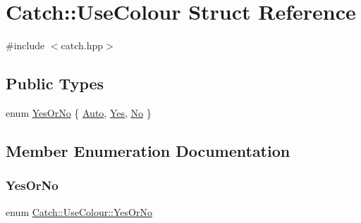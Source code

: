 \hypertarget{struct_catch_1_1_use_colour}{}\section{Catch\+:\+:Use\+Colour Struct Reference}
\label{struct_catch_1_1_use_colour}


{\ttfamily \#include $<$catch.\+hpp$>$}

\subsection*{Public Types}
\begin{DoxyCompactItemize}
\item 
enum \mbox{\hyperlink{struct_catch_1_1_use_colour_a6aa78da0c2de7539bb9e3757e204a3f1}{Yes\+Or\+No}} \{ \mbox{\hyperlink{struct_catch_1_1_use_colour_a6aa78da0c2de7539bb9e3757e204a3f1a5c7fa9f5f5536187e8f47df35b892bb7}{Auto}}, 
\mbox{\hyperlink{struct_catch_1_1_use_colour_a6aa78da0c2de7539bb9e3757e204a3f1ad7bb64e0fe49ba51aafbd3e14f06e98d}{Yes}}, 
\mbox{\hyperlink{struct_catch_1_1_use_colour_a6aa78da0c2de7539bb9e3757e204a3f1af80533ce38685131ea8d7a6360ce9e57}{No}}
 \}
\end{DoxyCompactItemize}


\subsection{Member Enumeration Documentation}
\mbox{\label{struct_catch_1_1_use_colour_a6aa78da0c2de7539bb9e3757e204a3f1}} 
\subsubsection{\texorpdfstring{Yes\+Or\+No}{YesOrNo}}
{\footnotesize\ttfamily enum \mbox{\hyperlink{struct_catch_1_1_use_colour_a6aa78da0c2de7539bb9e3757e204a3f1}{Catch\+::\+Use\+Colour\+::\+Yes\+Or\+No}}}

